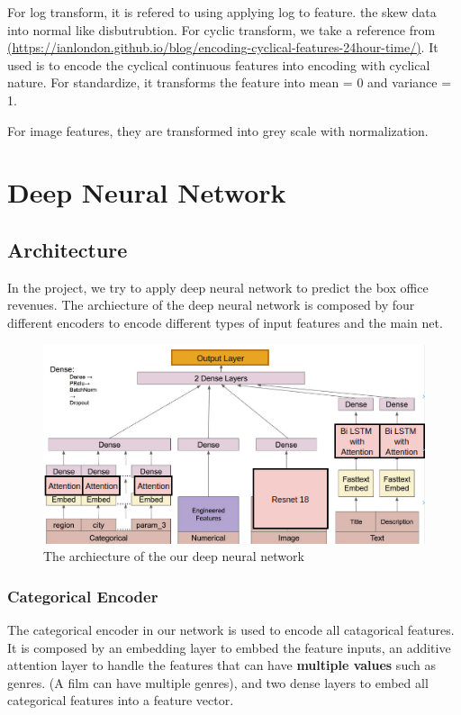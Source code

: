 \documentclass{article}
\begin{document}
For log transform, it is refered to using applying log to feature. the skew data into normal like disbutrubtion. For cyclic transform, we take a reference from \url{(https://ianlondon.github.io/blog/encoding-cyclical-features-24hour-time/)}. It used is to encode the cyclical continuous features into encoding with cyclical nature. For standardize, it transforms the feature into mean = 0 and variance = 1.

For image features, they are transformed into grey scale with normalization.

\pagebreak



\section{Deep Neural Network}

\subsection{Architecture}
In the project, we try to apply deep neural network to predict the box office revenues. The archiecture of the deep neural network is composed by four different encoders to encode different types of input features and the main net. 

\begin{figure}[h]
  \centering
  \includegraphics[scale=1]{map.png}
  \caption{The archiecture of the our deep neural network}
\end{figure}

\subsubsection{Categorical Encoder}

The categorical encoder in our network is used to encode all catagorical features. It is composed by an embedding layer to embbed the feature inputs, an additive attention layer to handle the features that can have \textbf{multiple values} such as genres. (A film can have multiple genres), and two dense layers to embed all categorical features into a feature vector.
\end{document}
